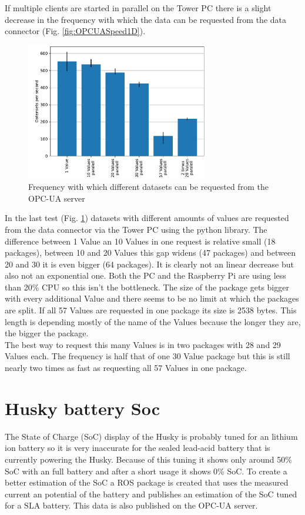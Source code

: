 \documentclass[conference]{IEEEtran}
\begin{document}
If multiple clients are started in parallel on the Tower PC there is a slight decrease in the frequency with which the data can be requested from the data connector (Fig. \ref{fig:OPCUASpeed1D}).
\begin{figure}[htbp]
    \centerline{\includegraphics[width=8cm]{Pictures/OPCUAMultipleDatenAufEinmal.pdf}}
    \caption{Frequency with which different datasets can be requested from the OPC-UA server}
    \label{fig:OPCUAMultipleDatenAufEinmal}
\end{figure}
In the last test (Fig. \ref{fig:OPCUAMultipleDatenAufEinmal}) datasets with different amounts of values are requested from the data connector via the Tower PC using the python library.
The difference between 1 Value an 10 Values in one request is relative small (18 packages), between 10 and 20 Values this gap widens (47 packages) and between 20 and 30 it is even bigger (64 packages).
It is clearly not an linear decrease but also not an exponential one. 
Both the PC and the Raspberry Pi are using less than 20\% CPU so this isn't the bottleneck.
The size of the package gets bigger with every additional Value and there seems to be no limit at which the packages are split.
If all 57 Values are requested in one package its size is 2538 bytes.
This length is depending mostly of the name of the Values because the longer they are, the bigger the package.\\
The best way to request this many Values is in two packages with 28 and 29 Values each.
The frequency is half that of one 30 Value package but this is still nearly two times as fast as requesting all 57 Values in one package.
\section{Husky battery Soc}
The State of Charge (SoC) display of the Husky is probably tuned for an lithium ion battery so it is very inaccurate for the sealed lead-acid battery that is currently powering the Husky.
Because of this tuning it shows only around 50\% SoC with an full battery and after a short usage it shows 0\% SoC.
To create a better estimation of the SoC a ROS package is created that uses the measured current an potential of the battery and publishes an estimation of the SoC tuned for a SLA battery.
This data is also published on the OPC-UA server.
\end{document}
